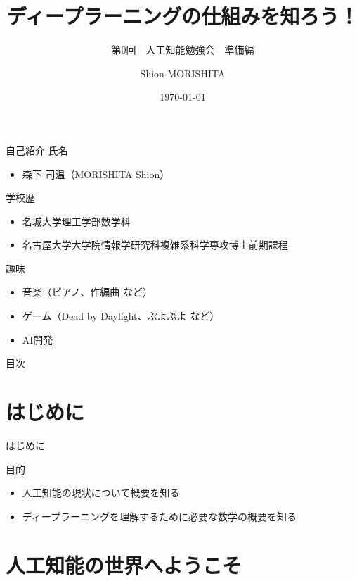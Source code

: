\documentclass[dvipdfmx,aspectratio=169]{beamer}
\title{ディープラーニングの仕組みを知ろう！}
\subtitle{第0回　人工知能勉強会　準備編}
\author{Shion MORISHITA}
\institute{}
\date{\today}
\begin{document}
	\begin{frame}[plain]
	    \maketitle
	\end{frame}
	
	\begin{frame}{自己紹介}
		\alert{氏名}
		\begin{itemize}
			\item 森下 司温（MORISHITA Shion）
		\end{itemize}
		\alert{学校歴}
		\begin{itemize}
			\item 名城大学理工学部数学科
			\item 名古屋大学大学院情報学研究科複雑系科学専攻博士前期課程
		\end{itemize}
		\alert{趣味}
		\begin{itemize}
			\item 音楽（ピアノ、作編曲 など）
			\item ゲーム（Dead by Daylight、ぷよぷよ など）
			\item AI開発
		\end{itemize}
	\end{frame}
	
	\begin{frame}[shrink]{目次}
		\vspace{1em}
		\tableofcontents
	\end{frame}
	
	\section{はじめに}
	\begin{frame}{はじめに}
		\begin{block}{目的}
			\begin{itemize}
				\item 人工知能の現状について概要を知る
				\item ディープラーニングを理解するために必要な数学の概要を知る
			\end{itemize}
		\end{block}
	\end{frame}

	\section{人工知能の世界へようこそ}
\end{document}
